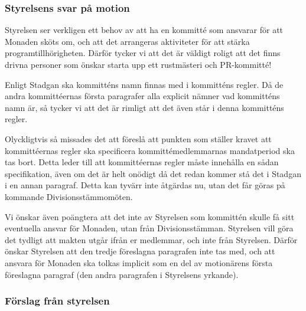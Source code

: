 \documentclass[protokoll]{dvd}
\begin{document}
    \subsubsection*{Styrelsens svar på motion}

Styrelsen ser verkligen ett behov av att ha en kommitté som ansvarar för att Monaden sköts om, och att det arrangeras aktiviteter för att stärka programtillhörigheten.
Därför tycker vi att det är väldigt roligt att det finns drivna personer som önskar starta upp ett rustmästeri och PR-kommitté!

Enligt Stadgan ska kommitténs namn finnas med i kommitténs regler.
Då de andra kommittéernas första paragrafer alla explicit nämner vad kommitténs namn är, så tycker vi att det är rimligt att det även står i denna kommitténs regler.

Olyckligtvis så missades det att föreslå att punkten som ställer kravet att kommittéernas regler ska specificera kommittémedlemmarnas mandatperiod ska tas bort.
Detta leder till att kommittéernas regler måste innehålla en sådan specifikation, även om det är helt onödigt då det redan kommer stå det i Stadgan i en annan paragraf.
Detta kan tyvärr inte åtgärdas nu, utan det får göras på kommande Divisionsstämmomöten.

Vi önskar även poängtera att det inte av Styrelsen som kommittén skulle få sitt eventuella ansvar för Monaden, utan från Divisionsstämman.
Styrelsen vill göra det tydligt att makten utgår ifrån er medlemmar, och inte från Styrelsen.
Därför önskar Styrelsen att den tredje föreslagna paragrafen inte tas med, och att ansvara för Monaden ska tolkas implicit som en del av motionärens första föreslagna paragraf (den andra paragrafen i Styrelsens yrkande).

        \subsubsection*{Förslag från styrelsen}
\end{document}
